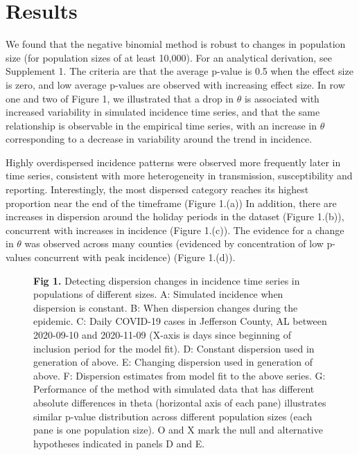 \documentclass[10pt,letterpaper]{article}
\begin{document}
\section*{Results}
We found that the negative binomial method is robust to changes in population size (for population sizes of at least 10,000). For an analytical derivation, see Supplement 1. The criteria are that the average p-value is 0.5 when the effect size is zero, and low average p-values are observed with increasing effect size. In row one and two of Figure 1, we illustrated that a drop in $\theta$ is associated with increased variability in simulated incidence time series, and that the same relationship is observable in the empirical time series, with an increase in $\theta$ corresponding to a decrease in variability around the trend in incidence.

Highly overdispersed incidence patterns were observed more frequently later in time series, consistent with more heterogeneity in transmission, susceptibility and reporting. Interestingly, the most dispersed category reaches its highest proportion near the end of the timeframe (Figure 1.(a)) In addition, there are increases in dispersion around the holiday periods in the dataset (Figure 1.(b)), concurrent with increases in incidence (Figure 1.(c)). The evidence for a change in $\theta$ was observed across many counties (evidenced by concentration of low p-values concurrent with peak incidence) (Figure 1.(d)).

\begin{figure}[!h]
\caption{{\bf Fig 1.}
Detecting dispersion changes in incidence time series in populations of different sizes. A: Simulated incidence when dispersion is constant. B: When dispersion changes during the epidemic. C: Daily COVID-19 cases in Jefferson County, AL between 2020-09-10 and 2020-11-09 (X-axis is days since beginning of inclusion period for the model fit). D: Constant dispersion used in generation of above. E: Changing dispersion used in generation of above. F: Dispersion estimates from model fit to the above series. G: Performance of the method with simulated data that has different absolute differences in theta (horizontal axis of each pane) illustrates similar p-value distribution across different population sizes (each pane is one population size). O and X mark the null and alternative hypotheses indicated in panels D and E. 
 }
\label{fig1}
\end{figure}
\end{document}
